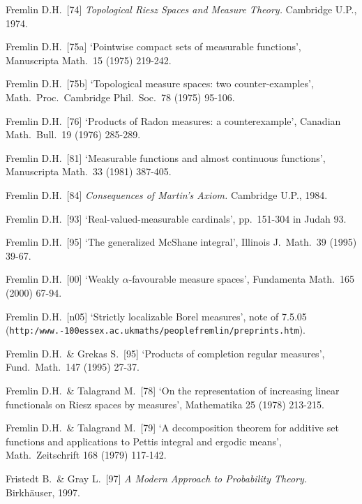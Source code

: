 {
Fremlin D.H.\ [74] {\it Topological Riesz Spaces and
Measure Theory.}   Cambridge U.P., 1974.
\cmmnt{[\S462 {\it notes\/}.]}

Fremlin D.H.\ [75a] `Pointwise compact sets of measurable functions',
Manuscripta Math.\ 15 (1975) 219-242.
\cmmnt{[463K.]}

Fremlin D.H.\ [75b] `Topological measure spaces:  two counter-examples',
Math.\ Proc.\ Cambridge Phil.\ Soc.\ 78 (1975) 95-106.
\cmmnt{[419C, 419D.]}

Fremlin D.H.\ [76] `Products of Radon measures:  a counterexample',
Canadian Math.\ Bull.\ 19 (1976) 285-289.
\cmmnt{[419E.]}

Fremlin D.H.\ [81] `Measurable functions and almost continuous
functions', Manuscripta Math.\ 33 (1981) 387-405.
\cmmnt{[451T.]}

Fremlin D.H.\ [84] {\it Consequences of Martin's Axiom.}
Cambridge U.P., 1984.
\cmmnt{[\S434 {\it notes\/}, 439Yk, 4A2E.]}

Fremlin D.H.\ [93] `Real-valued-measurable cardinals', pp.\ 151-304
in {\smc Judah 93}.
\cmmnt{[\S438 {\it notes\/}.]}

Fremlin D.H.\ [95] `The generalized McShane integral',
Illinois J.\ Math.\ 39 (1995) 39-67.
\cmmnt{[481N.]}

Fremlin D.H.\ [00] `Weakly $\alpha$-favourable measure spaces',
Fundamenta Math.\ 165 (2000) 67-94.
\cmmnt{[451V.]}

Fremlin D.H.\ [n05] `Strictly localizable Borel measures', note of 7.5.05
({\tt http:/{\bsp}www.\penalty-100essex.ac.uk{\bsp}maths/people{\bsp}fremlin/preprints.htm}).
\cmmnt{[434Yr.]}

Fremlin D.H.\ \& Grekas S.\ [95] `Products of completion regular
measures', Fund.\ Math.\ 147 (1995) 27-37.
\cmmnt{[434Q.]}

Fremlin D.H.\ \& Talagrand M.\ [78] `On the representation of increasing
linear functionals on Riesz spaces by measures', Mathematika 25 (1978)
213-215.
\cmmnt{[439I.]}

Fremlin D.H.\ \& Talagrand M.\ [79] `A decomposition theorem for
additive set functions and applications to Pettis integral and ergodic
means', Math.\ Zeitschrift 168 (1979) 117-142.
\cmmnt{[\S464.]}  %

Fristedt B.\ \& Gray L.\ [97] {\it A Modern Approach to Probability
Theory.}  Birkh\"auser, 1997.

}
